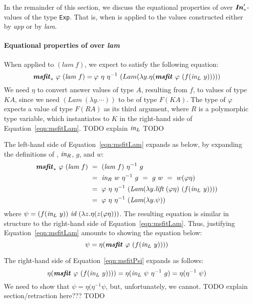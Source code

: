 In the remainder of this section, we discuss the equational properties
of \msfit{*} over $\textbf{\textit{In}}_{*}'$-values of the type \lstinline{Exp}. That is,
when \msfit{*} is applied to the values constructed either by \textit{app}
or by \textit{lam}.

\paragraph*{Equational properties of \msfit{*} over \textit{lam}}
When applied to $(\textit{lam}~f)$, we expect \msfit{*} to
satisfy the following equation:
\begin{equation}
\textbf{\textit{msfit}}_{*}~\varphi~(\textit{lam}~f)
= \varphi~\eta~\eta^{-1}~(Lam(\lambda y.\eta(\textbf{\textit{msfit}}_{~}\varphi~(f(\textit{in}_{L}~y)))))
\label{eqn:msfitLam}
\end{equation}
We need $\eta$ to convert answer values of type $A$, resulting from $f$,
to values of type $KA$, since we need $(\textit{Lam}~(\lambda y.\cdots))$
to be of type $F(KA)$. The type of $\varphi$ expects a value of type $F(RA)$
as its third argument, where $R$ is a polymorphic type variable, which
instantiates to $K$ in the right-hand side of Equation~\ref{eqn:msfitLam}.
TODO explain $\textit{in}_{L}$ TODO

The left-hand side of Equation~\ref{eqn:msfitLam} expands as below,
by expanding the definitions of \msfit{*}, $\textit{in}_{R}$, $g$, and  $w$:
\begin{align*}
\textbf{\textit{msfit}}_{*}~\varphi~(\textit{lam}~f)
&~=~ (\textit{lam}~f)~\eta^{-1}~g \\
&~=~ \textit{in}_{R}~w~\eta^{-1}~g ~=~ g~w ~=~ w(\varphi\eta) \\
&~=~ \varphi~\eta~\eta^{-1}~
	(\textit{Lam}(\lambda y.\textit{lift}~(\varphi\eta)~(f(\textit{in}_{L}~y)))) \\
&~=~ \varphi~\eta~\eta^{-1}~(\textit{Lam}(\lambda y.\psi))
\end{align*}
where $\psi = (f(\textit{in}_{L}~y))~\textit{id}~(\lambda z.\eta(z(\varphi\eta)))$.
The resulting equation is similar in structure to the right-hand side of
Equation~\ref{eqn:msfitLam}. Thus, justifying Equation~\ref{eqn:msfitLam}
amounts to showing the equation below:
\begin{equation}
\psi = \eta(\textbf{\textit{msfit}}_{~}\varphi~(f(\textit{in}_{L}~y))))
\label{eqn:msfitPsi}
\end{equation}

The right-hand side of Equation~\ref{eqn:msfitPsi} expands as follows:
\[ \eta(\textbf{\textit{msfit}}_{~}\varphi~(f(\textit{in}_{L}~y)))) = \eta(\textit{in}_{L}~\psi~\eta^{-1}~g)
	= \eta(\eta^{-1}~\psi)
\]
We need to show that $\psi = \eta(\eta^{-1}\psi$, but, unfortunately, we cannot.
TODO explain section/retraction here??? TODO 

